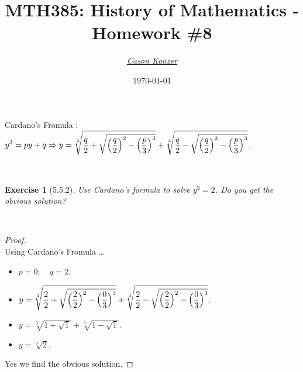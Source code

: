 \documentclass[12pt]{article}
\newcommand{\XB}{\color{black}}
\newcommand{\XBB}{\color{blue}}
\newcommand{\XV}{\color{violet}}
\newcommand{\ds}{\displaystyle}
\theoremstyle{plain}
\newtheorem{ex}{Exercise}
\begin{document}
\title{\textbf{MTH385}: History of Mathematics - Homework \#8}
\date{\today}
\author{\XV\textit{\large{\href{https://github.com/casonk}{Cason Konzer}}}\XB}

\maketitle

\hrulefill

\newpage


Cardano's Fromula : $ \ds y^{3} = py + q \Rightarrow y = \sqrt[3]{ \ds \frac{q}{2} + \sqrt{ \ds \Bigl( \frac{q}{2} \Bigr)^{2} - \Bigl( \frac{p}{3} \Bigr)^{3} }} + \sqrt[3]{ \ds \frac{q}{2} - \sqrt{ \ds \Bigl( \frac{q}{2} \Bigr)^{2} - \Bigl( \frac{p}{3} \Bigr)^{3} }} $.

\XBB\hrulefill\XB \\
\begin{ex} [5.5.2]
  Use Cardano's formula to solve $ y^{3} = 2 $. Do you get the obvious solution?
\end{ex}
\XBB\hrulefill\XB \\

\begin{proof}
  \ \\

  Using Cardano's Fromula \dots


  \begin{itemize}
    \item $ \ds p = 0 ; \quad q = 2 $.
    \item $ \ds y = \sqrt[3]{ \ds \frac{2}{2} + \sqrt{ \ds \Bigl( \frac{2}{2} \Bigr)^{2} - \Bigl( \frac{0}{3} \Bigr)^{3} }} + \sqrt[3]{ \ds \frac{2}{2} - \sqrt{ \ds \Bigl( \frac{2}{2} \Bigr)^{2} - \Bigl( \frac{0}{3} \Bigr)^{3} }} $.
    \item $ \ds y = \sqrt[3]{ \ds 1 + \sqrt{ \ds 1 }} + \sqrt[3]{ \ds 1 - \sqrt{ \ds 1 }} $.
    \item $ \ds y = \sqrt[3]{ \ds 2 } $.
  \end{itemize}

  Yes we find the obvious solution.

\end{proof}
\end{document}
